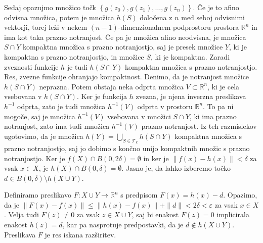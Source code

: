 \documentclass[mat1]{fmfdelo}
\newcommand{\R}{\mathbb R}
\newcommand{\0}{0}
\newcommand{\pT}{\mathcal T}
\begin{document}
\begin{dokaz}
Sedaj opazujmo množico točk $\left \{ g(z_0), g(z_1), \dots, g(z_n) \right \}$. Če je to afino odvisna množica, potem je množica $h(S)$ določena z $n$ med seboj odvisnimi vektorji, torej leži v nekem $(n-1)$-dimenzionalnem podprostoru prostora $\R^n$ in ima kot taka prazno notranjost. Če pa je množica afino neodvisna, je množica $S \cap Y$ kompaktna množica s prazno notranjostjo, saj je presek množice $Y$, ki je kompaktna s prazno notranjostjo, in množice $S$, ki je kompaktna. Zaradi zveznosti funkcije $h$ je tudi $h(S \cap Y)$ kompaktna množica s prazno notranjostjo. Res, zvezne funkcije ohranjajo kompaktnost. Denimo, da je notranjost množice $h(S \cap Y)$ neprazna. Potem obstaja neka odprta množica $V \subset \R^n$, ki je cela vsebovana v $h(S \cap Y)$. Ker je funkcija $h$ zvezna, je njena inverzna preslikava $h^{-1}$ odprta, zato je tudi množica $h^{-1}(V)$ odprta v prostoru $\R^n$. To pa ni mogoče, saj je množica $h^{-1}(V)$ vsebovana v množici $S \cap Y$, ki ima prazno notranjost, zato ima tudi množica $h^{-1}(V)$ prazno notranjost. Iz teh razmislekov ugotovimo, da je množica $h(Y) = \bigcup\limits_{S \in \pT_k} h(S \cap Y)$ kompaktna množica s prazno notranjostjo, saj jo dobimo s končno unijo kompaktnih množic s prazno notranjostjo. Ker je $f(X) \cap B(\0, 2 \delta) = \emptyset$ in ker je $\| f(x) - h(x) \| < \delta$ za vsak $x \in X$, je $h(X) \cap B(\0, \delta) = \emptyset$. Jasno je, da lahko izberemo točko $d \in B(\0, \delta) \setminus h(X \cup Y)$.

Definiramo preslikavo $F : X \cup Y \to \R^n$ s predpisom $F(x)  = h(x) - d$. Opazimo, da je $\| F(x) - f(x) \| \leq \| h(x) - f(x) \| + \| d \| < 2\delta < \varepsilon$ za vsak $x \in X$. Velja tudi $F(z) \neq \0$ za vsak $z \in X \cup Y$, saj bi enakost $F(z) = \0$ implicirala enakost $h(z) = d$, kar pa nasprotuje predpostavki, da je $d \notin h(X \cup Y)$. Preslikava $F$ je res iskana razširitev.
\end{dokaz}

\end{document}
